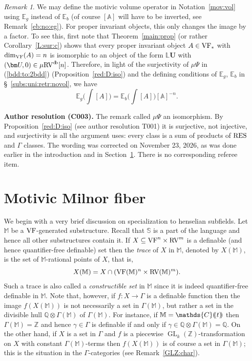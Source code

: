 \documentclass[12pt]{amsart}
\newcommand{\memph}[1]{{\color{magenta}\emph{#1}}}
\theoremstyle{plain}
\theoremstyle{definition}
\theoremstyle{remark}
\newtheorem{rem}[thm]{Remark}
\numberwithin{equation}{section}
\theoremstyle{plain}
\newcommand{\VF}{\textup{VF}}
\newcommand{\RV}{\textup{RV}}
\DeclareMathOperator{\mgl}{GL}
\newcommand{\Z}{\mathds{Z}}
\newcommand{\A}{\mathds{A}}
\newcommand{\C}{\mathds{C}}
\newcommand{\Q}{\mathds{Q}}
\newcommand{\0}{\emptyset}
\newcommand{\dpar}[1]{%
   (\mkern-4mu (#1 )\mkern-4mu )}
\newcommand{\bb}[1]{\mathbb{#1}}
\newcommand{\fun}{\longrightarrow}
\newcommand{\sub}{\subseteq}
\newcommand{\mgRV}{{\mu}{\RV}}
\newcommand{\RES}{\textup{RES}}
\DeclareMathOperator{\db}{d \! b}
\begin{document}
\begin{rem}\label{eg:eb:factor}
We may define the motivic volume operator in Notation~\ref{mov:vol} using $\bb E_g$ instead of $\bb E_b$ (of course $[\A]$ will have to be inverted, see Remark~\ref{eb:no:eg}).
For proper invariant objects, this only changes the image by a factor. To see this, first note that  Theorem~\ref{main:prop} (or rather Corollary~\ref{L:sur:c}) shows that every proper invariant object $A \in \VF_*$ with $\dim_{\VF}(A) = n$ is isomorphic to an object of the form $\bb L \bm U$ with $(\bm U, 0) \in  \mgRV^{\db}[n]$. Therefore, in light of the surjectivity of ${\mu}\Psi$ in (\ref{bdd:to:2bdd}) (Proposition~\ref{red:D:iso}) and the defining conditions of $\bb E_g$, $\bb E_b$ in \S~\ref{subs:uni:retr:novol}, we have
\begin{equation}\label{off:fac:A}
\bb E_g \Big (\int [A] \Big ) = \bb E_b \Big (\int [A] \Big )[\A]^{-n}.
\end{equation}
\end{rem}
{\normalfont\small\color{ResolutionGreen}
\noindent\textbf{Author resolution (C003).} The remark called ${\mu}\Psi$ an isomorphism. By
Proposition~\ref{red:D:iso} (see author resolution T001) it is surjective, not injective, and
surjectivity is all the argument uses: every class is a sum of products of $\RES$ and $\Gamma$
classes. The wording was corrected on November 23, 2026, as was done earlier in the introduction
and in Section~\ref{sec:spec:pui}. There is no corresponding referee item.\par}

\section{Motivic Milnor fiber}\label{sec:spec:pui}

We begin with a very brief discussion on specialization to henselian subfields. Let $\mathbb{M}$ be a $\VF$-generated  substructure. Recall that $\mathbb{S}$ is a part of the language and hence all other substructures contain it. If $X \sub \VF^n  \times \RV^m$ is a definable (and hence quantifier-free definable) set then the \memph{trace} of $X$ in $\mathbb{M}$, denoted by $X(\mathbb{M})$, is the set of $\mathbb{M}$-rational points of $X$, that is,
\[
X(\mathbb{M}) = X \cap (\VF(\mathbb{M})^n  \times \RV(\mathbb{M})^m).
\]
Such a trace is also called a \memph{constructible set} in $\mathbb{M}$ since it is indeed quantifier-free definable in $\mathbb{M}$. Note that, however, if $f : X \fun \Gamma$ is a definable function then the image $f(X(\mathbb{M}))$  is not necessarily a set in $\Gamma(\mathbb{M})$, but rather a set in the divisible hull $\Q \otimes \Gamma(\mathbb{M})$  of $\Gamma(\mathbb{M})$. For instance, if $\mathbb{M} = \C \dpar t$ then $\Gamma(\mathbb{M}) = \Z$ and hence $\gamma \in \Gamma$ is definable if and only if $\gamma \in \Q \otimes \Gamma(\mathbb{M}) = \Q$. On the other hand, if $X$ is a set in $\Gamma$ and $f$ is a piecewise $\mgl_k(\Z)$-transformation on $X$ with constant $\Gamma(\mathbb{M})$-terms  then $f(X(\mathbb{M}))$ is of course a set in $\Gamma(\mathbb{M})$; this is the situation in the $\Gamma$-categories (see Remark~\ref{GLZ:char}).
\end{document}
